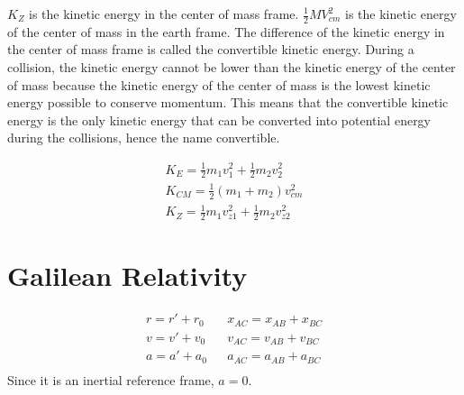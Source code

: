 \documentclass{article}
\theoremstyle{mytheoremstyle}
\theoremstyle{mytheoremstyle}
\theoremstyle{myproblemstyle}
\begin{document}
    $K_Z$ is the kinetic energy in the center of mass frame. $\frac{1}{2} MV_{cm}^2$
    is the kinetic energy of the center of mass in the earth frame. The
    difference of the kinetic energy in the center of mass frame is called the
    convertible kinetic energy. During a collision, the kinetic energy cannot be
    lower than the kinetic energy of the center of mass because the kinetic
    energy of the center of mass is the lowest kinetic energy possible to
    conserve momentum. This means that the convertible kinetic energy is the
    only kinetic energy that can be converted into potential energy during the
    collisions, hence the name convertible.

    \begin{align*}
        K_E    = \frac{1}{2} m_1v_1^2 + \frac{1}{2} m_2v_2^2 \\
        K_{CM} = \frac{1}{2} (m_1+m_2)v_{cm}^2 \\
        K_Z    = \frac{1}{2} m_1 v_{z1}^2 + \frac{1}{2} m_2 v_{z2}^2
    \end{align*}

    \section*{Galilean Relativity}
    \begin{align*}
        r=r'+r_0 && x_{AC} = x_{AB} + x_{BC} \\
        v=v'+v_0 && v_{AC} = v_{AB} + v_{BC} \\
        a=a'+a_0 && a_{AC} = a_{AB} + a_{BC} \\
    \end{align*}
    Since it is an inertial reference frame, $a=0$.
\end{document}
